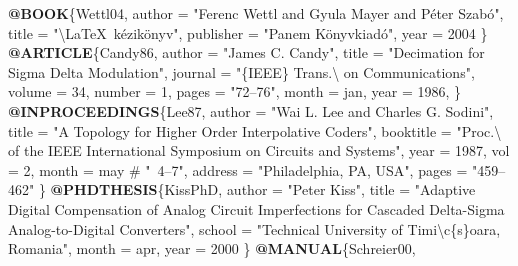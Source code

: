 \documentclass[11pt,magyar,a4paper,oneside,]{report}
\newenvironment{Shaded}{}{}
\newcommand{\KeywordTok}[1]{\textcolor[rgb]{0.00,0.44,0.13}{\textbf{{#1}}}}
\newcommand{\DataTypeTok}[1]{\textcolor[rgb]{0.56,0.13,0.00}{{#1}}}
\newcommand{\CharTok}[1]{\textcolor[rgb]{0.25,0.44,0.63}{{#1}}}
\newcommand{\StringTok}[1]{\textcolor[rgb]{0.25,0.44,0.63}{{#1}}}
\newcommand{\OtherTok}[1]{\textcolor[rgb]{0.00,0.44,0.13}{{#1}}}
\newcommand{\NormalTok}[1]{{#1}}
\begin{document}
\begin{Shaded}
\begin{Highlighting}[]
\KeywordTok{@BOOK}\NormalTok{\{}\OtherTok{Wettl04}\NormalTok{,}
  \DataTypeTok{author} \NormalTok{= "}\StringTok{Ferenc Wettl and Gyula Mayer and Péter Szabó}\NormalTok{",}
  \DataTypeTok{title} \NormalTok{= "}\CharTok{\textbackslash{}LaTeX}\StringTok{~kézikönyv}\NormalTok{",}
  \DataTypeTok{publisher} \NormalTok{= "}\StringTok{Panem Könyvkiadó}\NormalTok{",}
  \DataTypeTok{year} \NormalTok{= 2004}
\NormalTok{\}}
\KeywordTok{@ARTICLE}\NormalTok{\{}\OtherTok{Candy86}\NormalTok{,}
  \DataTypeTok{author} \NormalTok{= "}\StringTok{James C. Candy}\NormalTok{",}
  \DataTypeTok{title} \NormalTok{= "}\StringTok{Decimation for Sigma Delta Modulation}\NormalTok{",}
  \DataTypeTok{journal} \NormalTok{=  "}\StringTok{\{IEEE\} Trans.\textbackslash{} on Communications}\NormalTok{",}
  \DataTypeTok{volume} \NormalTok{= 34,}
  \DataTypeTok{number} \NormalTok{= 1,}
  \DataTypeTok{pages} \NormalTok{= "}\StringTok{72--76}\NormalTok{",}
  \DataTypeTok{month} \NormalTok{= }\StringTok{jan}\NormalTok{,}
  \DataTypeTok{year} \NormalTok{= 1986,}
\NormalTok{\}}
\KeywordTok{@INPROCEEDINGS}\NormalTok{\{}\OtherTok{Lee87}\NormalTok{,}
  \DataTypeTok{author} \NormalTok{= "}\StringTok{Wai L. Lee and Charles G. Sodini}\NormalTok{",}
  \DataTypeTok{title} \NormalTok{= "}\StringTok{A Topology for Higher Order Interpolative Coders}\NormalTok{",}
  \DataTypeTok{booktitle} \NormalTok{= "}\StringTok{Proc.\textbackslash{} of the IEEE International Symposium on Circuits and Systems}\NormalTok{",}
  \DataTypeTok{year} \NormalTok{= 1987,}
  \DataTypeTok{vol} \NormalTok{= 2,}
  \DataTypeTok{month} \NormalTok{= }\StringTok{may} \NormalTok{# "}\StringTok{~4--7}\NormalTok{",}
  \DataTypeTok{address} \NormalTok{= "}\StringTok{Philadelphia, PA, USA}\NormalTok{",}
  \DataTypeTok{pages} \NormalTok{= "}\StringTok{459--462}\NormalTok{"}
\NormalTok{\}}
\KeywordTok{@PHDTHESIS}\NormalTok{\{}\OtherTok{KissPhD}\NormalTok{,}
  \DataTypeTok{author} \NormalTok{= "}\StringTok{Peter Kiss}\NormalTok{",}
  \DataTypeTok{title} \NormalTok{= "}\StringTok{Adaptive Digital Compensation of Analog Circuit Imperfections for Cascaded Delta-Sigma Analog-to-Digital Converters}\NormalTok{",}
  \DataTypeTok{school} \NormalTok{= "}\StringTok{Technical University of Timi}\CharTok{\textbackslash{}c}\StringTok{\{s\}oara, Romania}\NormalTok{",}
  \DataTypeTok{month} \NormalTok{= }\StringTok{apr}\NormalTok{,}
  \DataTypeTok{year} \NormalTok{= 2000}
\NormalTok{\}}
\KeywordTok{@MANUAL}\NormalTok{\{}\OtherTok{Schreier00}\NormalTok{,}

\end{Highlighting}
\end{Shaded}
\end{document}
